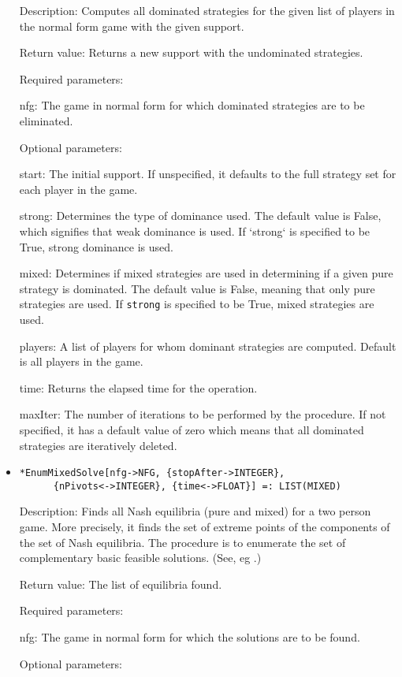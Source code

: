 \begin{itemize}
\bd
\item
[Description:] Computes all dominated strategies for the given list of
players in the normal form game with the given support.  
\item  
[Return value:] Returns a new support with the undominated strategies.

\item
[Required parameters:]\hfill\null 
\bd
\item
[nfg:] The game in normal form for which dominated strategies are to
be eliminated.
\ed	
\item
[Optional parameters:]\hfil\null

\bd
\item
[start:] The initial support.  If unspecified, it defaults to the full
strategy set for each player in the game.  
\item
[strong:] Determines the type of dominance used.  The default value is
False, which signifies that weak dominance is used.  If `strong` is
specified to be True, strong dominance is used.
\item
[mixed:] Determines if mixed strategies are used in determining if a
given pure strategy is dominated.  The default value is False, meaning
that only pure strategies are used. If \verb+strong+ is specified to
be True, mixed strategies are used.
\item
[players:] A list of players for whom dominant strategies are
computed.  Default is all players in the game.  
\item
[time:] Returns the elapsed time for the operation.
\item
[maxIter:] The number of iterations to be performed by the procedure.  If
not specified, it has a default value of zero which means that all
dominated strategies are iteratively deleted.
\ed
\ed

\item
\protect \large \begin{verbatim}
*EnumMixedSolve[nfg->NFG, {stopAfter->INTEGER},
      {nPivots<->INTEGER}, {time<->FLOAT}] =: LIST(MIXED)
\end{verbatim}\normalsize

\bd
\item
[Description:] Finds all Nash equilibria (pure and mixed) for a two
person game.  More precisely, it finds the set of extreme points of
the components of the set of Nash equilibria.  The procedure is to
enumerate the set of complementary basic feasible solutions. (See, eg
\cite[1964]{Man:64}.)
\item
[Return value:] The list of equilibria found.
\item
[Required parameters:]
\bd
\item
[nfg:] The game in normal form for which the solutions are to be found.  
\ed
\item
[Optional parameters:]\hfil\null


\end{itemize}
